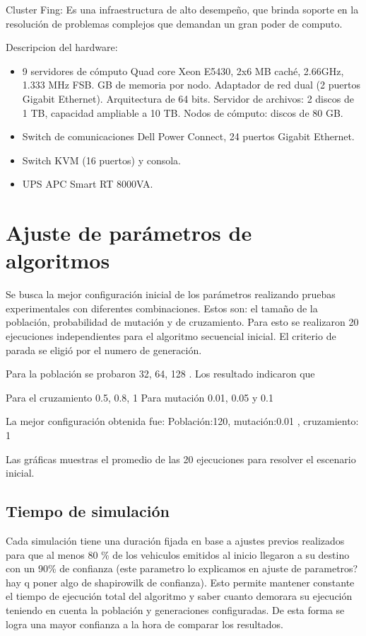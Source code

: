 Cluster Fing: Es una infraestructura de alto desempeño, que brinda soporte en la resolución de problemas complejos que demandan un gran poder de computo.

Descripcion del hardware: 
\begin{itemize}
	\item 9 servidores de cómputo
	\subitem Quad core Xeon E5430, 2x6 MB caché, 2.66GHz, 1.333 MHz FSB.
	 GB de memoria por nodo.
	\subitem Adaptador de red dual (2 puertos Gigabit Ethernet).
	\subitem  Arquitectura de 64 bits.
	\subitem Servidor de archivos: 2 discos de 1 TB, capacidad ampliable a 10 TB.
	\subitem Nodos de cómputo: discos de 80 GB.
	\item Switch de comunicaciones
	\subitem Dell Power Connect, 24 puertos Gigabit Ethernet.
	\item Switch KVM (16 puertos) y consola.
	\item UPS APC Smart RT 8000VA.
\end{itemize}

\section{Ajuste de parámetros de algoritmos}
Se busca la mejor configuración inicial de los parámetros realizando pruebas experimentales con diferentes combinaciones.  Estos son: el tamaño de la población,  probabilidad de mutación y de cruzamiento.
Para esto se realizaron 20 ejecuciones independientes para el algoritmo secuencial inicial.
El criterio de parada se eligió por el numero de generación.

Para la población se probaron 32, 64, 128 . Los resultado indicaron que 

Para el cruzamiento 0.5, 0.8, 1
Para mutación 0.01, 0.05 y 0.1

La mejor  configuración obtenida fue:
Población:120, mutación:0.01 , cruzamiento: 1

Las gráficas muestras el promedio de las 20 ejecuciones para resolver el escenario inicial.


\subsection{Tiempo de simulación}

Cada simulación tiene una duración fijada en base a ajustes previos realizados para que al menos 80 \% de los vehiculos emitidos al inicio llegaron a su destino con un 90\% de confianza (este parametro lo explicamos en ajuste de parametros? hay q poner algo de shapirowilk de confianza).
Esto  permite mantener constante el tiempo de ejecución total del algoritmo y saber cuanto demorara su ejecución teniendo en cuenta la población y generaciones configuradas. De esta forma se logra una mayor confianza a la hora de comparar los resultados.



